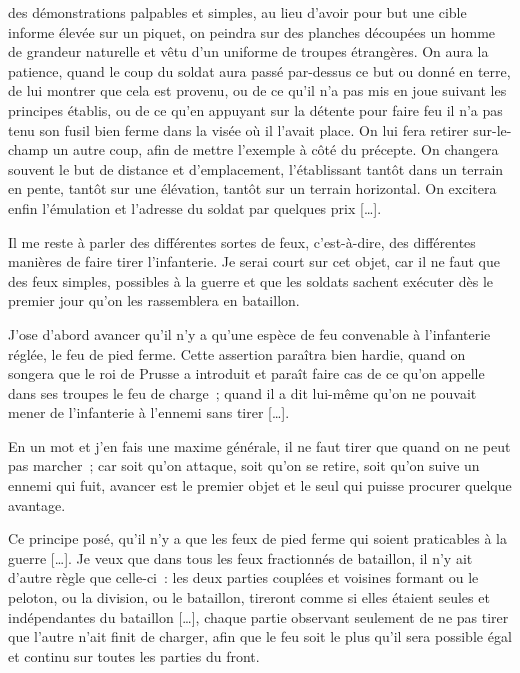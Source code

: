 \documentclass[french,twoside]{book} %
\begin{document}
\hyperref[bookmark13]{} des démonstrations palpables et simples, au lieu d’avoir pour but une cible informe élevée sur un piquet, on peindra sur des planches découpées un homme de grandeur naturelle et vêtu d’un uniforme de troupes étrangères. On aura la patience, quand le coup du soldat aura passé par-dessus ce but ou donné en terre, de lui montrer que cela est provenu, ou de ce qu’il n’a pas mis en joue suivant les principes établis, ou de ce qu’en appuyant sur la détente pour faire feu il n’a pas tenu son fusil bien ferme dans la visée où il l’avait place. On lui fera retirer sur-le-champ un autre coup, afin de mettre l’exemple à côté du précepte. On changera souvent le but de distance et d’emplacement, l’établissant tantôt dans un terrain en pente, tantôt sur une élévation, tantôt sur un terrain horizontal. On excitera enfin l’émulation et l’adresse du soldat par quelques prix […].\par
Il me reste à parler des différentes sortes de feux, c’est-à-dire, des différentes manières de faire tirer l’infanterie. Je serai court sur cet objet, car il ne faut que des feux simples, possibles à la guerre et que les soldats sachent exécuter dès le premier jour qu’on les rassemblera en bataillon.\par
J’ose d’abord avancer qu’il n’y a qu’une espèce de feu convenable à l’infanterie réglée, le feu de pied ferme. Cette assertion paraîtra bien hardie, quand on songera que le roi de Prusse a introduit et paraît faire cas de ce qu’on appelle dans ses troupes le feu de charge ; quand il a dit lui-même qu’on ne pouvait mener de l’infanterie à l’ennemi sans tirer […].\par
En un mot et j’en fais une maxime générale, il ne faut tirer que quand on ne peut pas marcher ; car soit qu’on attaque, soit qu’on se retire, soit qu’on suive un ennemi qui fuit, avancer est le premier objet et le seul qui puisse procurer quelque avantage.\par
Ce principe posé, qu’il n’y a que les feux de pied ferme qui soient praticables à la guerre […]. Je veux que dans tous les feux fractionnés de bataillon, il n’y ait d’autre règle que celle-ci : les deux parties couplées et voisines formant ou le peloton, ou la division, ou le bataillon, tireront comme si elles étaient seules et indépendantes du bataillon […], chaque partie observant seulement de ne pas tirer que l’autre n’ait finit de charger, afin que le feu soit le plus qu’il sera possible égal et continu sur toutes les parties du front.\par
\end{document}
